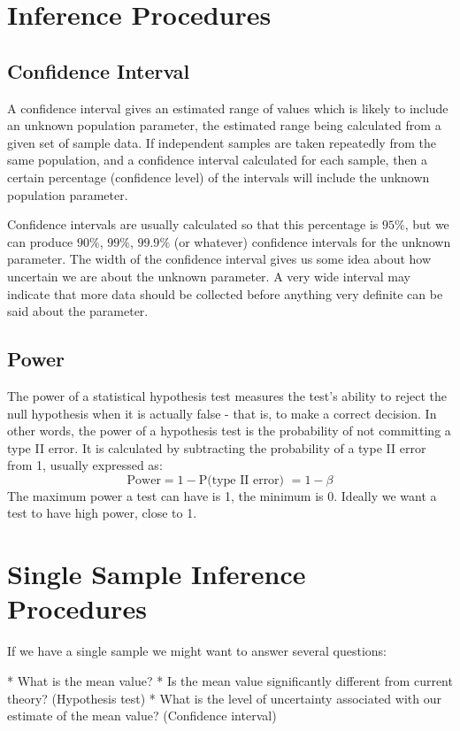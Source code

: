 \section{Inference Procedures}
\subsection{Confidence Interval }
A confidence interval gives an estimated range of values which is likely to include an unknown population parameter, the estimated range being calculated from a given set of sample data. If independent samples are taken repeatedly from the same population, and a confidence interval calculated for each sample, then a certain percentage (confidence level) of the intervals will include the unknown population parameter. 

Confidence intervals are usually calculated so that this percentage is $95\%$, but we can produce $90\%$, $99\%$, $99.9\%$ (or whatever) confidence intervals for the unknown parameter. The width of the confidence interval gives us some idea about how uncertain we are about the unknown parameter. A very wide interval may indicate that more data should be collected before anything very definite can be said about the parameter.
\subsection{Power }
The power of a statistical hypothesis test measures the test's ability to reject the null hypothesis when it is actually false - that is, to make a correct decision. In other words, the power of a hypothesis test is the probability of not committing a type II error. It is calculated by subtracting the probability of a type II error from 1, usually expressed as: 
\[\mbox{Power} = 1 - \mbox{P(type II error) } = 1- \beta \]The maximum power a test can have is 1, the minimum is 0. Ideally we want a test to have high power, close to 1.

\section{Single Sample Inference Procedures}
If we have a single sample we might want to answer several
questions:
\begin{itemize}
	* What is the mean value? * Is the mean value
	significantly different from current theory? (Hypothesis test)
	* What is the level of uncertainty associated with our
	estimate of the mean value? (Confidence interval)
\end{itemize}

